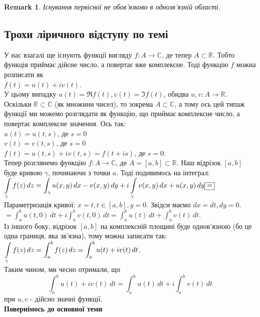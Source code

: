 \documentclass[a4paper, 10pt]{article}
\theoremstyle{theoremdd}
\theoremstyle{theoremdd}
\theoremstyle{theoremdd}
\theoremstyle{theoremdd}
\theoremstyle{theoremdd}
\theoremstyle{theoremdd}
\newtheorem{remark}[theorem]{Remark}
\theoremstyle{theoremdd}
\theoremstyle{theoremdd}
\begin{document}
\begin{remark}
Існування первісної не обов'язково в однозв'язній області.
\end{remark}

\subsection*{Трохи ліричного відступу по темі}
У нас взагалі ще існують функції вигляду $f: A \to \mathbb{C}$, де тепер $A \subset \mathbb{R}$. Тобто функція приймає дійсне число, а повертає вже комплексне. Тоді функцію $f$ можна розписати як\\
$f(t) = u(t) + iv(t)$.\\
У цьому випадку $u(t) = \Re f(t), v(t) = \Im f(t)$, обидва $u,v: A \to \mathbb{R}$.
\bigskip \\
Оскільки $\mathbb{R} \subset \mathbb{C}$ (як множини чисел), то зокрема $A \subset \mathbb{C}$, а тому ось цей типаж функції ми можемо розглядати як функцію, що приймає комплексне число, а повертає комплексне значення. Ось так:\\
$u(t) = u(t,s)$, де $s = 0$\\
$v(t) = v(t,s)$, де $s = 0$\\
$f(t) = u(t,s) + iv(t,s) = f(t+is)$, де $s = 0$.
\bigskip \\
Тепер розглянемо функцію $f: A \to \mathbb{C}$, де $A = [a,b] \subset \mathbb{R}$. Наш відрізок $[a,b]$ буде кривою $\gamma$, починаючи з точки $a$. Тоді подивимось на інтеграл:\\
$\displaystyle\int\displaylimits_\gamma f(z)\,dz = \int_\gamma u(x,y)\,dx -v(x,y)\,dy + i \int\displaylimits_\gamma v(x,y)\,dx + u(x,y)\,dy \boxed{=}$\\
Параметризація кривої: $x = t, t \in [a,b], y = 0$. Звідси маємо $dx = dt, dy = 0$.\\
$\boxed{=} \displaystyle\int_a^b u(t,0)\,dt + i \int_a^b v(t,0)\,dt = \int_a^b u(t)\,dt + \int_a^b v(t)\,dt$.\\
Із іншого боку, відрізок $[a,b]$ на комплексній площині буде однов'язною (бо це одна границя, яка зв'язна), тому можна записати так:\\
$\displaystyle\int\displaylimits_\gamma f(z)\,dz = \int_a^b f(z)\,dz = \int_a^b u(t)+iv(t)\,dt$.\\
Таким чином, ми чесно отримали, що
$$ \int_a^b u(t)+iv(t)\,dt = \int_a^b u(t)\,dt + i \int_a^b v(t)\,dt$$
при $u,v$ - дійсно значні функції.
\bigskip \\
\textbf{Повернімось до основної теми}
\end{document}
